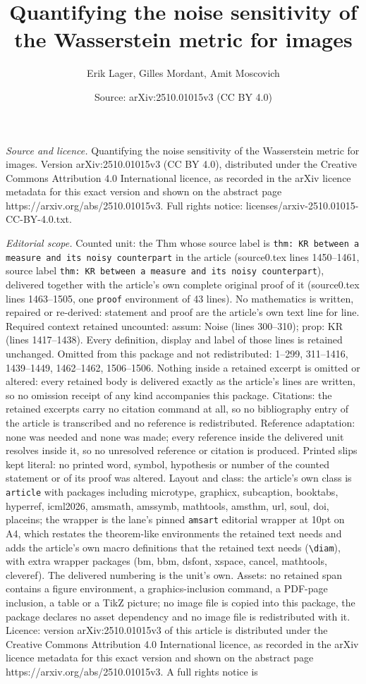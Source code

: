 \documentclass[10pt,a4paper]{amsart}
\title[Quantifying the noise sensitivity of the Wasserstein metric ]{Quantifying the noise sensitivity of the Wasserstein metric for images}
\author{Erik Lager, Gilles Mordant, Amit Moscovich}
\date{Source: arXiv:2510.01015v3 (CC BY 4.0)}
\begin{document}
\maketitle

\noindent\emph{Source and licence.} Quantifying the noise sensitivity of the Wasserstein metric for images. Version arXiv:2510.01015v3 (CC BY 4.0), distributed under the Creative Commons Attribution 4.0 International licence, as recorded in the arXiv licence metadata for this exact version and shown on the abstract page https://arxiv.org/abs/2510.01015v3. Full rights notice: licenses/arxiv-2510.01015-CC-BY-4.0.txt.\par\smallskip

\noindent\textit{Editorial scope.} Counted unit: the Thm whose source label is \texttt{thm: KR between a measure and its noisy counterpart} in the article (source0.tex lines 1450--1461, source label \texttt{thm: KR between a measure and its noisy counterpart}), delivered together with the article's own complete original proof of it (source0.tex lines 1463--1505, one \texttt{proof} environment of 43 lines). No mathematics is written, repaired or re-derived: statement and proof are the article's own text line for line. Required context retained uncounted: assum: Noise (lines 300--310); prop: KR (lines 1417--1438). Every definition, display and label of those lines is retained unchanged. Omitted from this package and not redistributed: 1--299, 311--1416, 1439--1449, 1462--1462, 1506--1506. Nothing inside a retained excerpt is omitted or altered: every retained body is delivered exactly as the article's lines are written, so no omission receipt of any kind accompanies this package. Citations: the retained excerpts carry no citation command at all, so no bibliography entry of the article is transcribed and no reference is redistributed. Reference adaptation: none was needed and none was made; every reference inside the delivered unit resolves inside it, so no unresolved reference or citation is produced. Printed slips kept literal: no printed word, symbol, hypothesis or number of the counted statement or of its proof was altered. Layout and class: the article's own class is \texttt{article} with packages including microtype, graphicx, subcaption, booktabs, hyperref, icml2026, amsmath, amssymb, mathtools, amsthm, url, soul, doi, placeins; the wrapper is the lane's pinned \texttt{amsart} editorial wrapper at 10pt on A4, which restates the theorem-like environments the retained text needs and adds the article's own macro definitions that the retained text needs (\texttt{\textbackslash diam}), with extra wrapper packages (bm, bbm, dsfont, xspace, cancel, mathtools, cleveref). The delivered numbering is the unit's own. Assets: no retained span contains a figure environment, a graphics-inclusion command, a PDF-page inclusion, a table or a TikZ picture; no image file is copied into this package, the package declares no asset dependency and no image file is redistributed with it. Licence: version arXiv:2510.01015v3 of this article is distributed under the Creative Commons Attribution 4.0 International licence, as recorded in the arXiv licence metadata for this exact version and shown on the abstract page https://arxiv.org/abs/2510.01015v3. A full rights notice is 
\end{document}
